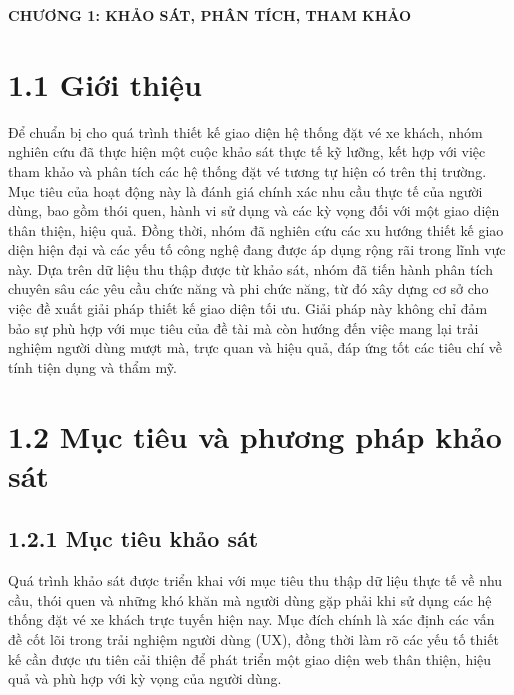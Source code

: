 \newpage


\begin{center}
    {\large\textbf{CHƯƠNG 1: KHẢO SÁT, PHÂN TÍCH, THAM KHẢO}}
\end{center}

\onehalfspacing
\section*{1.1 Giới thiệu}

Để chuẩn bị cho quá trình thiết kế giao diện hệ thống đặt vé xe khách, nhóm nghiên cứu đã thực hiện một cuộc khảo sát thực tế kỹ lưỡng, kết hợp với việc tham khảo và phân tích các hệ thống đặt vé tương tự hiện có trên thị trường. 
Mục tiêu của hoạt động này là đánh giá chính xác nhu cầu thực tế của người dùng, bao gồm thói quen, hành vi sử dụng và các kỳ vọng đối với một giao diện thân thiện, hiệu quả. 
Đồng thời, nhóm đã nghiên cứu các xu hướng thiết kế giao diện hiện đại và các yếu tố công nghệ đang được áp dụng rộng rãi trong lĩnh vực này.
 Dựa trên dữ liệu thu thập được từ khảo sát, nhóm đã tiến hành phân tích chuyên sâu các yêu cầu chức năng và phi chức năng, từ đó xây dựng cơ sở cho việc đề xuất giải pháp thiết kế giao diện tối ưu. 
 Giải pháp này không chỉ đảm bảo sự phù hợp với mục tiêu của đề tài mà còn hướng đến việc mang lại trải nghiệm người dùng mượt mà, trực quan và hiệu quả, đáp ứng tốt các tiêu chí về tính tiện dụng và thẩm mỹ.

  \section*{1.2 Mục tiêu và phương pháp khảo sát}

 \subsection*{1.2.1 Mục tiêu khảo sát}
 Quá trình khảo sát được triển khai với mục tiêu thu thập dữ liệu thực tế về nhu cầu, thói quen và những khó khăn mà người dùng gặp phải khi sử dụng các hệ thống đặt vé xe khách trực tuyến hiện nay. Mục đích chính là xác định các vấn đề cốt lõi trong trải nghiệm người dùng (UX), đồng thời làm rõ các yếu tố thiết kế cần được ưu tiên cải thiện để phát triển một giao diện web thân thiện, hiệu quả và phù hợp với kỳ vọng của người dùng. 

